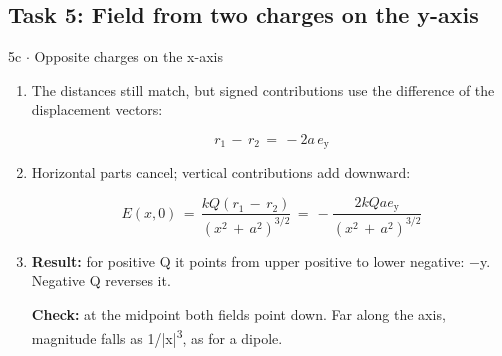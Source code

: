 \documentclass[11pt]{article}
\begin{document}
\begin{keepsection}\subsection{Task 5: Field from two charges on the y-axis}

\begin{workedbox}{5c \ensuremath{\cdot} Opposite charges on the x-axis}
\begin{enumerate}
\item {}
The distances still match, but signed contributions use the difference of the displacement vectors:

\begin{equation*}{r}_{1}\, -\, {r}_{2}\, =\, -2{a\,e}_{\mathrm{y}}\end{equation*}
\item {}
Horizontal parts cancel; vertical contributions add downward:

\begin{equation*}{E}({x},0)\, =\, \dfrac{{kQ}({r}_{1}\, -\, {r}_{2})}{({x}^{2}\, +\, {a}^{2})^{3/2}}\, =\, -\dfrac{2{kQa}{e}_{\mathrm{y}}}{({x}^{2}\, +\, {a}^{2})^{3/2}}\end{equation*}
\item {}
\textbf{Result:} for positive Q it points from upper positive to lower negative: \ensuremath{-}y. Negative Q reverses it.

\textbf{Check:} at the midpoint both fields point down. Far along the axis, magnitude falls as 1/|x|\textsuperscript{3}, as for a dipole.


\end{enumerate}
\end{workedbox}
\end{keepsection}
\end{document}
